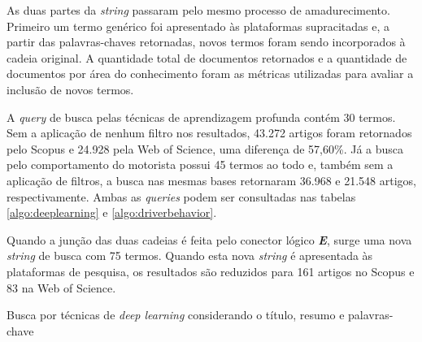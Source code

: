 \documentclass[10pt,journal,compsoc]{IEEEtran}
\begin{document}
As duas partes da
\textit{string} passaram pelo mesmo processo de amadurecimento. Primeiro um termo genérico foi apresentado às plataformas
supracitadas e, a partir das palavras-chaves retornadas, novos termos
foram sendo incorporados à cadeia original. A quantidade total de documentos
retornados e a quantidade de documentos por área do conhecimento foram
as métricas utilizadas para avaliar a inclusão de novos
termos.

A \textit{query} de busca pelas técnicas de aprendizagem profunda
contém 30 termos. Sem a aplicação de nenhum filtro nos resultados, 43.272 artigos foram
retornados pelo Scopus e 24.928 pela Web of Science, uma diferença de
57,60\%. Já a busca pelo comportamento do motorista possui 45
termos ao todo e, também sem a aplicação de filtros, a busca nas
mesmas bases retornaram 36.968 e 21.548 artigos, respectivamente. Ambas as \textit{queries} podem ser
consultadas nas tabelas \ref{algo:deeplearning} e
\ref{algo:driverbehavior}.

Quando a junção das duas cadeias é feita pelo conector lógico
\emph{\textbf{E}}, surge uma nova \textit{string} de busca com 75 termos. Quando esta nova
\textit{string} é apresentada às plataformas de pesquisa, os
resultados são reduzidos para 161 artigos no Scopus e 83 na Web of
Science.

\begin{algorithm}
  \label{algo:deeplearning}
  \renewcommand{\algorithmcfname}{String de busca}
  \caption{Busca por técnicas de \textit{deep learning} considerando o
  título, resumo e palavras-chave}
  \SetAlgoLined
  \DontPrintSemicolon
  \;
  \Indp
        
              
      
        
            
      
              
            
                
      
          
    \;
\end{algorithm}
\end{document}
